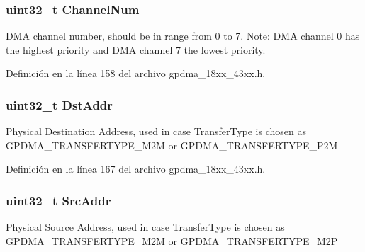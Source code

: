 \subsubsection[{\texorpdfstring{Channel\+Num}{ChannelNum}}]{\setlength{\rightskip}{0pt plus 5cm}uint32\+\_\+t Channel\+Num}\hypertarget{struct_g_p_d_m_a___c_h___c_f_g___t_aa3166850f4797686bb04226d148742fd}{}\label{struct_g_p_d_m_a___c_h___c_f_g___t_aa3166850f4797686bb04226d148742fd}
D\+MA channel number, should be in range from 0 to 7. Note\+: D\+MA channel 0 has the highest priority and D\+MA channel 7 the lowest priority. 

Definición en la línea 158 del archivo gpdma\+\_\+18xx\+\_\+43xx.\+h.

\subsubsection[{\texorpdfstring{Dst\+Addr}{DstAddr}}]{\setlength{\rightskip}{0pt plus 5cm}uint32\+\_\+t Dst\+Addr}\hypertarget{struct_g_p_d_m_a___c_h___c_f_g___t_ae83c3b6dde756c02f1281fbc925ea5d8}{}\label{struct_g_p_d_m_a___c_h___c_f_g___t_ae83c3b6dde756c02f1281fbc925ea5d8}
Physical Destination Address, used in case Transfer\+Type is chosen as G\+P\+D\+M\+A\+\_\+\+T\+R\+A\+N\+S\+F\+E\+R\+T\+Y\+P\+E\+\_\+\+M2M or G\+P\+D\+M\+A\+\_\+\+T\+R\+A\+N\+S\+F\+E\+R\+T\+Y\+P\+E\+\_\+\+P2M 

Definición en la línea 167 del archivo gpdma\+\_\+18xx\+\_\+43xx.\+h.

\subsubsection[{\texorpdfstring{Src\+Addr}{SrcAddr}}]{\setlength{\rightskip}{0pt plus 5cm}uint32\+\_\+t Src\+Addr}\hypertarget{struct_g_p_d_m_a___c_h___c_f_g___t_a6e644599a1ad75e09ff2ed801d2b3f45}{}\label{struct_g_p_d_m_a___c_h___c_f_g___t_a6e644599a1ad75e09ff2ed801d2b3f45}
Physical Source Address, used in case Transfer\+Type is chosen as G\+P\+D\+M\+A\+\_\+\+T\+R\+A\+N\+S\+F\+E\+R\+T\+Y\+P\+E\+\_\+\+M2M or G\+P\+D\+M\+A\+\_\+\+T\+R\+A\+N\+S\+F\+E\+R\+T\+Y\+P\+E\+\_\+\+M2P 

